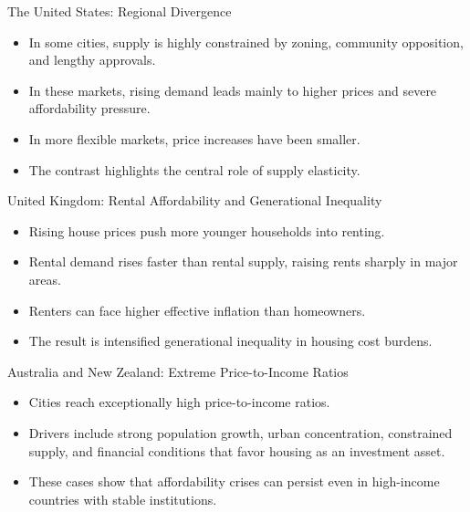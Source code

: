 \documentclass[aspectratio=169]{beamer}
\begin{document}
\begin{frame}{The United States: Regional Divergence}
\transfade
\begin{itemize}[<+->]
  \item In some cities, supply is highly constrained by zoning, community opposition, and lengthy approvals.
  \item In these markets, rising demand leads mainly to higher prices and severe affordability pressure.
  \item In more flexible markets, price increases have been smaller.
  \item The contrast highlights the central role of supply elasticity.
\end{itemize}
\end{frame}

\begin{frame}{United Kingdom: Rental Affordability and Generational Inequality}
\transfade
\begin{itemize}[<+->]
  \item Rising house prices push more younger households into renting.
  \item Rental demand rises faster than rental supply, raising rents sharply in major areas.
  \item Renters can face higher effective inflation than homeowners.
  \item The result is intensified generational inequality in housing cost burdens.
\end{itemize}
\end{frame}

\begin{frame}{Australia and New Zealand: Extreme Price-to-Income Ratios}
\transfade
\begin{itemize}[<+->]
  \item Cities reach exceptionally high price-to-income ratios.
  \item Drivers include strong population growth, urban concentration, constrained supply, and financial conditions that favor housing as an investment asset.
  \item These cases show that affordability crises can persist even in high-income countries with stable institutions.
\end{itemize}
\end{frame}
\end{document}
